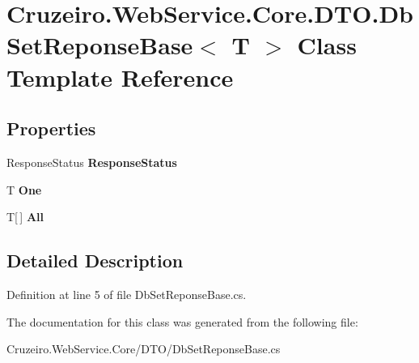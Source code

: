 \hypertarget{class_cruzeiro_1_1_web_service_1_1_core_1_1_d_t_o_1_1_db_set_reponse_base}{}\section{Cruzeiro.\+Web\+Service.\+Core.\+D\+T\+O.\+Db\+Set\+Reponse\+Base$<$ T $>$ Class Template Reference}
\label{class_cruzeiro_1_1_web_service_1_1_core_1_1_d_t_o_1_1_db_set_reponse_base}
\subsection*{Properties}
\begin{DoxyCompactItemize}
\item 
Response\+Status {\bfseries Response\+Status}\hypertarget{class_cruzeiro_1_1_web_service_1_1_core_1_1_d_t_o_1_1_db_set_reponse_base_ad88240c9c9413379676c0b7011a205c9}{}\label{class_cruzeiro_1_1_web_service_1_1_core_1_1_d_t_o_1_1_db_set_reponse_base_ad88240c9c9413379676c0b7011a205c9}

\item 
T {\bfseries One}\hypertarget{class_cruzeiro_1_1_web_service_1_1_core_1_1_d_t_o_1_1_db_set_reponse_base_a62ac97d16224aa39e5ca184659750193}{}\label{class_cruzeiro_1_1_web_service_1_1_core_1_1_d_t_o_1_1_db_set_reponse_base_a62ac97d16224aa39e5ca184659750193}

\item 
T\mbox{[}$\,$\mbox{]} {\bfseries All}\hypertarget{class_cruzeiro_1_1_web_service_1_1_core_1_1_d_t_o_1_1_db_set_reponse_base_a74374f0fe847524920310138dd26a906}{}\label{class_cruzeiro_1_1_web_service_1_1_core_1_1_d_t_o_1_1_db_set_reponse_base_a74374f0fe847524920310138dd26a906}

\end{DoxyCompactItemize}


\subsection{Detailed Description}


Definition at line 5 of file Db\+Set\+Reponse\+Base.\+cs.



The documentation for this class was generated from the following file\+:\begin{DoxyCompactItemize}
\item 
Cruzeiro.\+Web\+Service.\+Core/\+D\+T\+O/Db\+Set\+Reponse\+Base.\+cs\end{DoxyCompactItemize}
